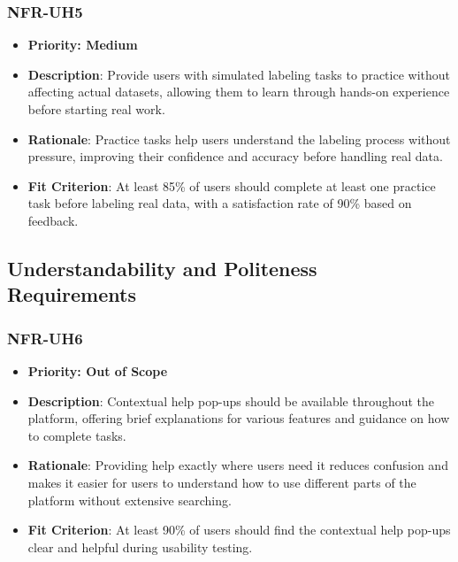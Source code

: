 \documentclass[12pt]{article}
\begin{document}
        \subsubsection*{NFR-UH5} 
        \label{sec:UH5}
        \begin{itemize} 
          \item \textbf{Priority: Medium}
            \item \textbf{Description}: Provide users with simulated labeling tasks to practice without affecting actual datasets, allowing them to learn through hands-on experience before starting real work.  
            \item \textbf{Rationale}: Practice tasks help users understand the labeling process without pressure, improving their confidence and accuracy before handling real data.  
            \item \textbf{Fit Criterion}: At least 85\% of users should complete at least one practice task before labeling real data, with a satisfaction rate of 90\% based on feedback.
        \end{itemize}


\subsection{Understandability and Politeness Requirements}


\subsubsection*{NFR-UH6} 
\label{sec:UH6}
        \begin{itemize} 
          \item \textbf{Priority: Out of Scope}
            \item \textbf{Description}: Contextual help pop-ups should be available throughout the platform, offering brief explanations for various features and guidance on how to complete tasks.  
            \item \textbf{Rationale}: Providing help exactly where users need it reduces confusion and makes it easier for users to understand how to use different parts of the platform without extensive searching.  
            \item \textbf{Fit Criterion}: At least 90\% of users should find the contextual help pop-ups clear and helpful during usability testing.
        \end{itemize}
\end{document}

